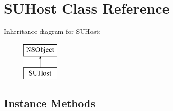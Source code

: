 \hypertarget{interface_s_u_host}{}\section{S\+U\+Host Class Reference}
\label{interface_s_u_host}
Inheritance diagram for S\+U\+Host\+:\begin{figure}[H]
\begin{center}
\leavevmode
\includegraphics[height=2.000000cm]{interface_s_u_host}
\end{center}
\end{figure}
\subsection*{Instance Methods}
